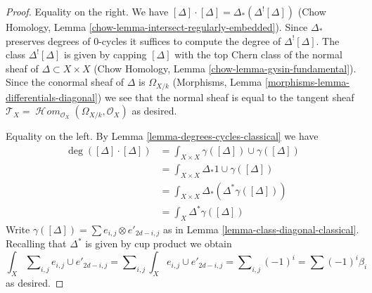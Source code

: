 \documentclass[10pt,a4paper]{amsart}
\theoremstyle{plain}
\theoremstyle{definition}
\theoremstyle{remark}
\numberwithin{equation}{subsection}
\def\SheafHom{\mathop{\mathcal{H}\!\mathit{om}}\nolimits}
\begin{document}
\begin{proof}
Equality on the right. We have
$[\Delta] \cdot [\Delta] = \Delta_*(\Delta^![\Delta])$
(Chow Homology, Lemma \ref{chow-lemma-intersect-regularly-embedded}).
Since $\Delta_*$ preserves degrees of $0$-cycles it suffices to compute
the degree of $\Delta^![\Delta]$. The class $\Delta^![\Delta]$ is given
by capping $[\Delta]$ with
the top Chern class of the normal sheaf of $\Delta \subset X \times X$
(Chow Homology, Lemma \ref{chow-lemma-gysin-fundamental}).
Since the conormal sheaf of $\Delta$ is $\Omega_{X/k}$
(Morphisms, Lemma \ref{morphisms-lemma-differentials-diagonal})
we see that the normal sheaf is equal to the tangent sheaf
$\mathcal{T}_X = \SheafHom_{\mathcal{O}_X}(\Omega_{X/k}, \mathcal{O}_X)$
as desired.

\medskip\noindent
Equality on the left. By Lemma \ref{lemma-degrees-cycles-classical} we have
\begin{align*}
\deg([\Delta] \cdot [\Delta])
& =
\int_{X \times X} \gamma([\Delta]) \cup \gamma([\Delta]) \\
& =
\int_{X \times X} \Delta_*1 \cup \gamma([\Delta]) \\
& =
\int_{X \times X} \Delta_*(\Delta^*\gamma([\Delta])) \\
& =
\int_X \Delta^*\gamma([\Delta])
\end{align*}
Write $\gamma([\Delta]) = \sum  e_{i, j} \otimes e'_{2d - i , j}$
as in Lemma \ref{lemma-class-diagonal-classical}.
Recalling that $\Delta^*$ is given by cup product we obtain
$$
\int_X \sum\nolimits_{i, j} e_{i, j} \cup e'_{2d - i, j} =
\sum\nolimits_{i, j} \int_X e_{i, j} \cup e'_{2d - i, j} =
\sum\nolimits_{i, j} (-1)^i = \sum (-1)^i\beta_i
$$
as desired.
\end{proof}
\end{document}
